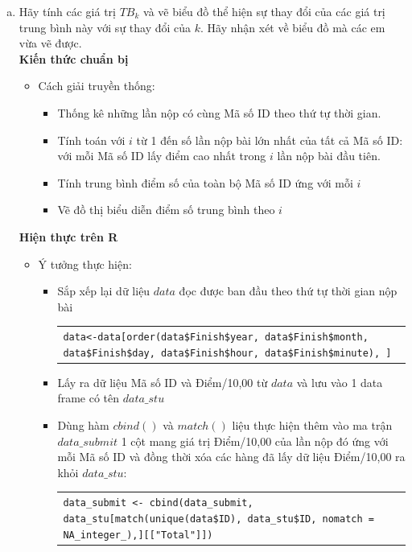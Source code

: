 \documentclass[a4paper]{article}
\theoremstyle{definition}
\begin{document}
\begin{enumerate}[a)]
    
    \bf\item Hãy tính các giá trị $TB_k$ và vẽ biểu đồ thể hiện sự thay đổi của các giá trị trung bình này với sự thay đổi của $k$. Hãy nhận xét về biểu đồ mà các em vừa vẽ được.\\[6pt]
    \bf Kiến thức chuẩn bị\normalfont
    \begin{itemize}
        \item Cách giải truyền thống:
        \begin{itemize}
            \item Thống kê những lần nộp có cùng Mã số ID theo thứ tự thời gian.
            \item Tính toán với $i$ từ 1 đến số lần nộp bài lớn nhất của tất cả Mã số ID: với mỗi Mã số ID lấy điểm cao nhất trong $i$ lần nộp bài đầu tiên.
            \item Tính trung bình điểm số của toàn bộ Mã số ID ứng với mỗi $i$
            \item Vẽ đồ thị biểu diễn điểm số trung bình theo $i$
        \end{itemize}
    \end{itemize}
    \bf Hiện thực trên R\normalfont
    \begin{itemize}
        \item Ý tưởng thực hiện:
        \begin{itemize}
            \item Sắp xếp lại dữ liệu $data$ đọc được ban đầu  theo thứ tự thời gian nộp bài
            \begin{center}
                \begin{tabular}{p{13cm}}
                    \texttt{data<-data[order(data\$Finish\$year, data\$Finish\$month, data\$Finish\$day, data\$Finish\$hour, data\$Finish\$minute), ]}
                \end{tabular}
            \end{center}
            \item Lấy ra dữ liệu Mã số ID và Điểm/10,00 từ $data$ và lưu vào 1 data frame có tên $data\_stu$ 
            \item Dùng hàm $cbind()$ và $match()$ liệu thực hiện thêm vào ma trận $data\_submit$ 1 cột mang giá trị Điểm/10,00 của lần nộp đó ứng với mỗi Mã số ID và đồng thời xóa các hàng đã lấy dữ liệu Điểm/10,00 ra khỏi $data\_stu$:
            \begin{center}
                \begin{tabular}{p{13cm}}
                     \texttt{data\_submit <- cbind(data\_submit, data\_stu[match(unique(data\$ID), data\_stu\$ID, nomatch = NA\_integer\_),][["Total"]])}\\

\end{tabular}
\end{center}
\end{itemize}
\end{itemize}
\end{enumerate}
\end{document}
